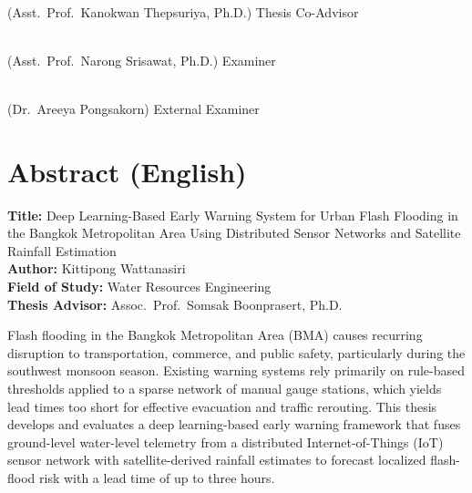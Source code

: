 \documentclass[12pt,a4paper]{report}
\begin{document}
\noindent
\begin{minipage}{\textwidth}
\hspace{2cm}\hrulefill\\
\hspace{2cm} (Asst.\ Prof.\ Kanokwan Thepsuriya, Ph.D.) \hfill Thesis Co-Advisor
\end{minipage}
\par
\vspace{0.8cm}

\noindent
\begin{minipage}{\textwidth}
\hspace{2cm}\hrulefill\\
\hspace{2cm} (Asst.\ Prof.\ Narong Srisawat, Ph.D.) \hfill Examiner
\end{minipage}
\par
\vspace{0.8cm}

\noindent
\begin{minipage}{\textwidth}
\hspace{2cm}\hrulefill\\
\hspace{2cm} (Dr.\ Areeya Pongsakorn) \hfill External Examiner
\end{minipage}

\chapter*{Abstract (English)}

\noindent\textbf{Title:} Deep Learning-Based Early Warning System for Urban Flash Flooding in the Bangkok Metropolitan Area Using Distributed Sensor Networks and Satellite Rainfall Estimation\\[4pt]
\textbf{Author:} Kittipong Wattanasiri\\[4pt]
\textbf{Field of Study:} Water Resources Engineering\\[4pt]
\textbf{Thesis Advisor:} Assoc.\ Prof.\ Somsak Boonprasert, Ph.D.

\vspace{0.4cm}
\noindent
Flash flooding in the Bangkok Metropolitan Area (BMA) causes recurring disruption to transportation, commerce, and public safety, particularly during the southwest monsoon season. Existing warning systems rely primarily on rule-based thresholds applied to a sparse network of manual gauge stations, which yields lead times too short for effective evacuation and traffic rerouting. This thesis develops and evaluates a deep learning-based early warning framework that fuses ground-level water-level telemetry from a distributed Internet-of-Things (IoT) sensor network with satellite-derived rainfall estimates to forecast localized flash-flood risk with a lead time of up to three hours.
\end{document}
